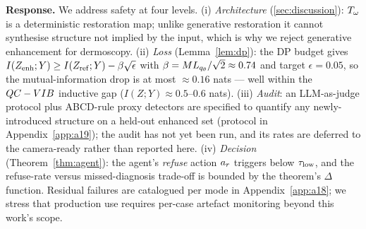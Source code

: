 \textbf{Response.} We address safety at four levels. (i) \emph{Architecture} (\cref{sec:discussion}):
$T_\omega$ is a deterministic restoration map; unlike generative restoration it cannot synthesise
structure not implied by the input, which is why we reject generative enhancement for dermoscopy.
(ii) \emph{Loss} (Lemma~\ref{lem:dp}): the DP budget gives
$I(Z_{\mathrm{enh}};Y)\geq I(Z_{\mathrm{ref}};Y)-\beta\sqrt{\epsilon}$ with $\beta=ML_{q_\theta}/\sqrt{2}\approx 0.74$ and target
$\epsilon=0.05$, so the mutual-information drop is at most $\approx 0.16$ nats --- well within the
$QC-VIB$ inductive gap ($I(Z;Y)\approx 0.5$--$0.6$ nats). (iii) \emph{Audit}: an LLM-as-judge protocol
plus ABCD-rule proxy detectors are specified to quantify any newly-introduced structure on a
held-out enhanced set (protocol in Appendix~\ref{app:a19}); the audit has not yet been run, and its
rates are deferred to the camera-ready rather than reported here. (iv) \emph{Decision}
(Theorem~\ref{thm:agent}): the agent's \emph{refuse} action $a_r$ triggers below $\tau_{\mathrm{low}}$, and the
refuse-rate versus missed-diagnosis trade-off is bounded by the theorem's $\Delta$ function. Residual
failures are catalogued per mode in Appendix~\ref{app:a18}; we stress that production use requires
per-case artefact monitoring beyond this work's scope.
